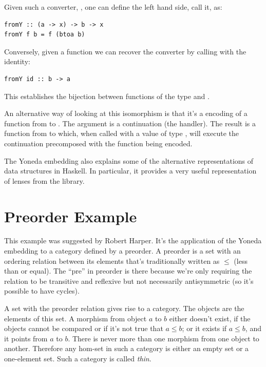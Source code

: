 Given such a converter, , one can define the left hand
side, call it, as:

\begin{Verbatim}
fromY :: (a -> x) -> b -> x
fromY f b = f (btoa b)
\end{Verbatim}
Conversely, given a function  we can recover the converter
by calling  with the identity:

\begin{Verbatim}
fromY id :: b -> a
\end{Verbatim}
This establishes the bijection between functions of the type
 and .

An alternative way of looking at this isomorphism is that it's a 
encoding of a function from  to . The argument
 is a continuation (the handler). The result
is a function from  to  which, when called with a
value of type , will execute the continuation precomposed with
the function being encoded.

The Yoneda embedding also explains some of the alternative
representations of data structures in Haskell. In particular, it
provides a 
{very useful representation}
of lenses from the  library.

\section{Preorder Example}

This example was suggested by Robert Harper. It's the application of the
Yoneda embedding to a category defined by a preorder. A preorder is a
set with an ordering relation between its elements that's traditionally
written as $\leqslant$ (less than or equal). The ``pre'' in
preorder is there because we're only requiring the relation to be
transitive and reflexive but not necessarily antisymmetric (so it's
possible to have cycles).

A set with the preorder relation gives rise to a category. The objects
are the elements of this set. A morphism from object $a$ to
$b$ either doesn't exist, if the objects cannot be compared or if
it's not true that $a \leqslant b$; or it exists if
$a \leqslant b$, and it points from $a$ to
$b$. There is never more than one morphism from one object to
another. Therefore any hom-set in such a category is either an empty set
or a one-element set. Such a category is called \emph{thin}.

